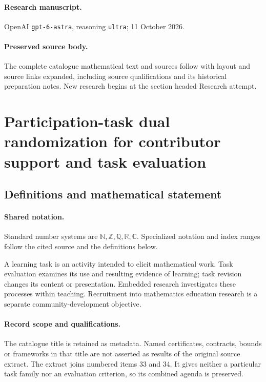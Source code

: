 \documentclass[11pt]{article}
\begin{document}
\paragraph{Research manuscript.} OpenAI \texttt{gpt-6-astra}, reasoning \texttt{ultra}; 11 October 2026.
\paragraph{Preserved source body.} The complete catalogue mathematical text and sources follow with layout and source links expanded, including source qualifications and its historical preparation notes. New research begins at the section headed Research attempt.

\section{Participation-task dual randomization for contributor support and task evaluation}\label{statement}

\subsection{Definitions and mathematical statement}

\paragraph{Shared notation.}Standard number systems are $\mathbb N,\mathbb Z,\mathbb Q,\mathbb R,\mathbb C$. Specialized notation and index ranges follow the cited source and the definitions below.


A learning task is an activity intended to elicit mathematical work. Task evaluation examines its use and resulting evidence of learning; task revision changes its content or presentation. Embedded research investigates these processes within teaching. Recruitment into mathematics education research is a separate community-development objective.
\paragraph{Record scope and qualifications.}
The catalogue title is retained as metadata. Named certificates, contracts, bounds or frameworks in that title are not asserted as results of the original source extract.
The extract joins numbered items 33 and 34. It gives neither a particular task family nor an evaluation criterion, so its combined agenda is preserved.
\end{document}
